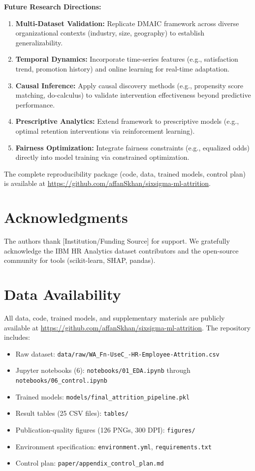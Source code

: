 \documentclass[conference]{IEEEtran}
\begin{document}
\textbf{Future Research Directions:}
\begin{enumerate}
    \item \textbf{Multi-Dataset Validation:} Replicate DMAIC framework across diverse organizational contexts (industry, size, geography) to establish generalizability.
    \item \textbf{Temporal Dynamics:} Incorporate time-series features (e.g., satisfaction trend, promotion history) and online learning for real-time adaptation.
    \item \textbf{Causal Inference:} Apply causal discovery methods (e.g., propensity score matching, do-calculus) to validate intervention effectiveness beyond predictive performance.
    \item \textbf{Prescriptive Analytics:} Extend framework to prescriptive models (e.g., optimal retention interventions via reinforcement learning).
    \item \textbf{Fairness Optimization:} Integrate fairness constraints (e.g., equalized odds) directly into model training via constrained optimization.
\end{enumerate}

The complete reproducibility package (code, data, trained models, control plan) is available at \url{https://github.com/affanSkhan/sixsigma-ml-attrition}.

\section*{Acknowledgments}
The authors thank [Institution/Funding Source] for support. We gratefully acknowledge the IBM HR Analytics dataset contributors and the open-source community for tools (scikit-learn, SHAP, pandas).

\section*{Data Availability}
All data, code, trained models, and supplementary materials are publicly available at \url{https://github.com/affanSkhan/sixsigma-ml-attrition}. The repository includes:
\begin{itemize}
    \item Raw dataset: \texttt{data/raw/WA\_Fn-UseC\_-HR-Employee-Attrition.csv}
    \item Jupyter notebooks (6): \texttt{notebooks/01\_EDA.ipynb} through \texttt{notebooks/06\_control.ipynb}
    \item Trained models: \texttt{models/final\_attrition\_pipeline.pkl}
    \item Result tables (25 CSV files): \texttt{tables/}
    \item Publication-quality figures (126 PNGs, 300 DPI): \texttt{figures/}
    \item Environment specification: \texttt{environment.yml}, \texttt{requirements.txt}
    \item Control plan: \texttt{paper/appendix\_control\_plan.md}
\end{itemize}
\end{document}
